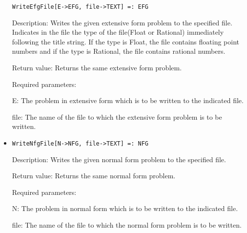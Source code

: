 \begin{itemize}
\protect \large \begin{verbatim}
WriteEfgFile[E->EFG, file->TEXT] =: EFG
\end{verbatim}\normalsize

\bd
\item
[Description:] Writes the given extensive form problem to the
specified file.  Indicates in the file the type of the file(Float or
Rational) immediately following the title string.  If the type is
Float, the file contains floating point numbers and if the type is
Rational, the file contains rational numbers.
\item
[Return value:] Returns the same extensive form problem.
\item
[Required parameters:]\hfil\null

\bd
\item
[E:] The problem in extensive form which is to be written to the
indicated file.
\item
[file:] The name of the file to which the extensive form problem is to
be written.
\ed
\ed

\item

\protect \large \begin{verbatim}
WriteNfgFile[N->NFG, file->TEXT] =: NFG
\end{verbatim}\normalsize

\bd
\item
[Description:] Writes the given normal form problem to the specified
file.
\item
[Return value:] Returns the same normal form problem.
\item
[Required parameters:]\hfil\null

\bd
\item
[N:] The problem in normal form which is to be written to the
indicated file.

\item
[file:] The name of the file to which the normal form problem is
to be written.
\ed
\ed
\end{itemize}










 




















